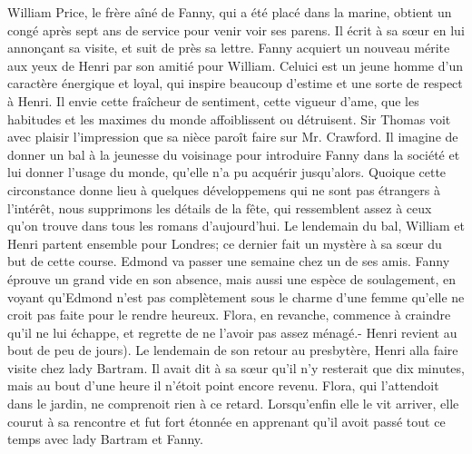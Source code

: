 William Price, le frère aîné de Fanny, qui a été placé dans la marine, obtient un congé après sept ans de service pour venir voir ses parens. Il écrit à sa sœur en lui annonçant sa visite, et suit de près sa lettre. Fanny acquiert un nouveau mérite aux yeux de Henri par son amitié pour William. Celuici est un jeune homme d’un caractère énergique et loyal, qui inspire beaucoup d’estime et une sorte de respect à Henri. Il envie cette fraîcheur de sentiment, cette vigueur d’ame, que les habitudes et les maximes du monde affoiblissent ou détruisent. Sir Thomas voit avec plaisir l’impression que sa nièce paroît faire sur Mr. Crawford. Il imagine de donner un bal à la jeunesse du voisinage pour introduire Fanny dans la société et lui donner l’usage du monde, qu’elle n’a pu acquérir jusqu’alors. Quoique cette circonstance donne lieu à quelques développemens\setcounter{page}{254} qui ne sont pas étrangers à l'intérêt, nous supprimons les détails de la fête, qui ressemblent assez à ceux qu'on trouve dans tous les romans d'aujourd'hui. Le lendemain du bal, William et Henri partent ensemble pour Londres; ce dernier fait un mystère à sa sœur du but de cette course. Edmond va passer une semaine chez un de ses amis. Fanny éprouve un grand vide en son absence, mais aussi une espèce de soulagement, en voyant qu'Edmond n'est pas complètement sous le charme d'une femme qu'elle ne croit pas faite pour le rendre heureux. Flora, en revanche, commence à craindre qu'il ne lui échappe, et regrette de ne l'avoir pas assez ménagé.- Henri revient au bout de peu de jours).
Le lendemain de son retour au presbytère, Henri alla faire visite chez lady Bartram. Il avait dit à sa sœur qu'il n'y resterait que dix minutes, mais au bout d'une heure il n'étoit point encore revenu. Flora, qui l'attendoit dans le jardin, ne comprenoit rien à ce retard. Lorsqu'enfin elle le vit arriver, elle courut à sa rencontre et fut fort étonnée en apprenant qu'il avoit passé tout ce temps avec lady Bartram et Fanny.
